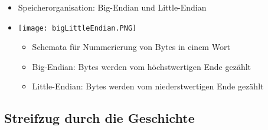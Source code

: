\begin{itemize}
\begin{itemize}
                \item Speicherorganisation: Big-Endian und Little-Endian 
                \item[]
                    \begin{minipage}{0.2\textwidth}
                    \texttt{[image: bigLittleEndian.PNG]}
                    \end{minipage}
                    \begin{minipage}[t]{0.7\textwidth}
                    \vspace{-1.2cm}
                        \begin{itemize}
                            \item Schemata für Nummerierung von Bytes in einem Wort
                            \item Big-Endian: Bytes werden vom höchstwertigen Ende gezählt
                            \item Little-Endian: Bytes werden vom niederstwertigen Ende gezählt
                        \end{itemize}
                    \end{minipage}
            \end{itemize}
            
    \end{itemize}

\pagebreak

\subsection{Streifzug durch die Geschichte}

